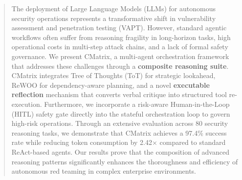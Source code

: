 \begin{abstract}
The deployment of Large Language Models (LLMs) for autonomous security operations represents a transformative shift in vulnerability assessment and penetration testing (VAPT). However, standard agentic workflows often suffer from reasoning fragility in long-horizon tasks, high operational costs in multi-step attack chains, and a lack of formal safety governance. We present CMatrix, a multi-agent orchestration framework that addresses these challenges through a \textbf{composite reasoning suite}. CMatrix integrates Tree of Thoughts (ToT) for strategic lookahead, ReWOO for dependency-aware planning, and a novel \textbf{executable reflection} mechanism that converts verbal critique into structured tool re-execution. Furthermore, we incorporate a risk-aware Human-in-the-Loop (HITL) safety gate directly into the stateful orchestration loop to govern high-risk operations. Through an extensive evaluation across 80 security reasoning tasks, we demonstrate that CMatrix achieves a 97.4\% success rate while reducing token consumption by 2.42$\times$ compared to standard ReAct-based agents. Our results prove that the composition of advanced reasoning patterns significantly enhances the thoroughness and efficiency of autonomous red teaming in complex enterprise environments.
\end{abstract}

